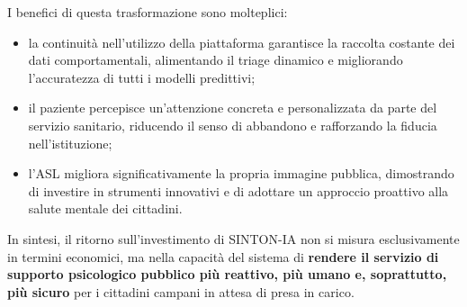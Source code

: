 I benefici di questa trasformazione sono molteplici:
\begin{itemize}
    \item la continuità nell'utilizzo della piattaforma garantisce la raccolta costante dei dati comportamentali, alimentando il triage dinamico e migliorando l'accuratezza di tutti i modelli predittivi;
    \item il paziente percepisce un'attenzione concreta e personalizzata da parte del servizio sanitario, riducendo il senso di abbandono e rafforzando la fiducia nell'istituzione;
    \item l'ASL migliora significativamente la propria immagine pubblica, dimostrando di investire in strumenti innovativi e di adottare un approccio proattivo alla salute mentale dei cittadini.
\end{itemize}

In sintesi, il ritorno sull'investimento di SINTON-IA non si misura esclusivamente in termini economici, ma nella capacità del sistema di \textbf{rendere il servizio di supporto psicologico pubblico più reattivo, più umano e, soprattutto, più sicuro} per i cittadini campani in attesa di presa in carico.

